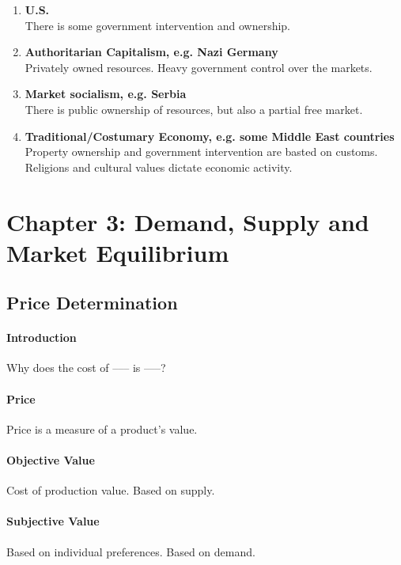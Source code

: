 \begin{enumerate}[label = \textbullet]
	\item \textbf{U.S.}\\There is some government intervention and ownership.\\[-1ex]

	\item \textbf{Authoritarian Capitalism, e.g. Nazi Germany} \\ Privately owned resources. Heavy government control over the markets.\\[-1ex]

	\item \textbf{Market socialism, e.g. Serbia} \\ There is public ownership of resources, but also a partial free market.\\[-1ex]

	\item \textbf{Traditional/Costumary Economy, e.g. some Middle East countries} \\ Property ownership and government intervention are basted on customs. Religions and cultural values dictate economic activity.
\end{enumerate}

\newpage
\section{Chapter 3: Demand, Supply and Market Equilibrium}

\subsection{Price Determination}

\paragraph{Introduction} Why does the cost of ––– is –––?

\paragraph{Price} Price is a measure of a product's value.

\paragraph{Objective Value} Cost of production value. Based on supply.

\paragraph{Subjective Value} Based on individual preferences. Based on demand.
